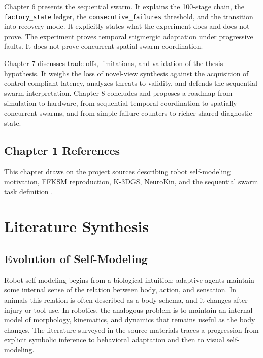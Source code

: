 \documentclass[12pt,a4paper,oneside]{report}
\begin{document}
Chapter 6 presents the sequential swarm. It explains the 100-stage chain, the \texttt{factory\_state} ledger, the \texttt{consecutive\_failures} threshold, and the transition into recovery mode. It explicitly states what the experiment does and does not prove. The experiment proves temporal stigmergic adaptation under progressive faults. It does not prove concurrent spatial swarm coordination.

Chapter 7 discusses trade-offs, limitations, and validation of the thesis hypothesis. It weighs the loss of novel-view synthesis against the acquisition of control-compliant latency, analyzes threats to validity, and defends the sequential swarm interpretation. Chapter 8 concludes and proposes a roadmap from simulation to hardware, from sequential temporal coordination to spatially concurrent swarms, and from simple failure counters to richer shared diagnostic state.

\section*{Chapter 1 References}

This chapter draws on the project sources describing robot self-modeling motivation, FFKSM reproduction, K-3DGS, NeuroKin, and the sequential swarm task definition \cite{bongard2006resilient,cully2015robots,kwiatkowski2019task,chen2022full,hu2024teaching,mildenhall2020nerf,kerbl20233d,hu2025learning}.

\chapter{Literature Synthesis}

\section{Evolution of Self-Modeling}

Robot self-modeling begins from a biological intuition: adaptive agents maintain some internal sense of the relation between body, action, and sensation. In animals this relation is often described as a body schema, and it changes after injury or tool use. In robotics, the analogous problem is to maintain an internal model of morphology, kinematics, and dynamics that remains useful as the body changes. The literature surveyed in the source materials traces a progression from explicit symbolic inference to behavioral adaptation and then to visual self-modeling.
\end{document}
